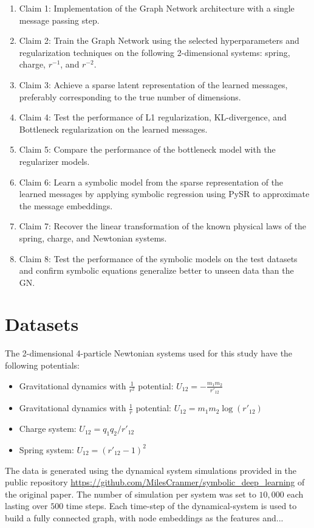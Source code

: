 \documentclass{article}
\begin{document}
\begin{enumerate}
    \item Claim 1: Implementation of the Graph Network architecture with a single message passing step.
    \item Claim 2: Train the Graph Network using the selected hyperparameters and regularization techniques on the following 2-dimensional systems: spring, charge, \( r^{-1} \), and \( r^{-2} \).
    \item Claim 3: Achieve a sparse latent representation of the learned messages, preferably corresponding to the true number of dimensions.
    \item Claim 4: Test the performance of L1 regularization, KL-divergence, and Bottleneck regularization on the learned messages.
    \item Claim 5: Compare the performance of the bottleneck model with the regularizer models.
    \item Claim 6: Learn a symbolic model from the sparse representation of the learned messages by applying symbolic regression using PySR to approximate the message embeddings.
    \item Claim 7: Recover the linear transformation of the known physical laws of the spring, charge, and Newtonian systems.
    \item Claim 8: Test the performance of the symbolic models on the test datasets and confirm symbolic equations generalize better to unseen data than the GN.
\end{enumerate}


\section{Datasets}


The 2-dimensional 4-particle Newtonian systems used for this study have the following potentials:
\begin{itemize}
    \item Gravitational dynamics with \( \frac{1}{r^2} \) potential: \( U_{12} = -\frac{m_1 m_2}{r'_{12}} \)
    \item Gravitational dynamics with \( \frac{1}{r} \) potential: \( U_{12} = m_1 m_2 \log(r'_{12}) \)
    \item Charge system: \( U_{12} = q_1 q_2/r'_{12} \)
    \item Spring system: \( U_{12} = (r'_{12} - 1)^2 \)
\end{itemize}


The data is generated using the dynamical system simulations provided in the public repository \url{ https://github.com/MilesCranmer/symbolic_deep_learning} of the original paper. The number of simulation per system was set to $10,000$ each lasting over $500$ time steps. Each time-step of the dynamical-system is used to build a fully connected graph, with node embeddings as the features and...
\end{document}
